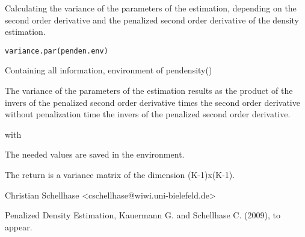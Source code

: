 \begin{Description}\relax
Calculating the variance of the parameters of the estimation, depending on the second order derivative and the penalized second order derivative of the density estimation.
\end{Description}
\begin{Usage}
\begin{verbatim}
variance.par(penden.env)
\end{verbatim}
\end{Usage}
\begin{Arguments}
\begin{ldescription}
\item[\code{penden.env}] Containing all information, environment of pendensity()
\end{ldescription}
\end{Arguments}
\begin{Details}\relax
The variance of the parameters of the estimation results as the product of the invers of the penalized second order derivative times the second order derivative without penalization time the invers of the penalized second order derivative.

 with 

The needed values are saved in the environment.
\end{Details}
\begin{Value}
The return is a variance matrix of the dimension (K-1)x(K-1).
\end{Value}
\begin{Author}\relax
Christian Schellhase <cschellhase@wiwi.uni-bielefeld.de>
\end{Author}
\begin{References}\relax
Penalized Density Estimation, Kauermann G. and Schellhase C. (2009), to appear.
\end{References}

